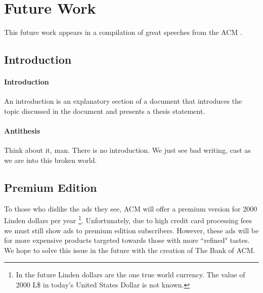 \section{Future Work}
\label{sec:future}
This future work appears in a compilation of great speeches from the ACM
\cite{acm-state}.

\subsection{Introduction}
\paragraph{Introduction} An introduction is an explanatory section of a document that introduces the topic discussed in the document and presents a thesis statement.
\paragraph{Antithesis} Think about it, man. There is no introduction. We just see bad writing, cast as we are into this broken world.

\subsection{Premium Edition}
To those who dislike the ads they see, ACM will offer a premium version for
 2000 Linden dollars per year \footnote{In the future Linden dollars are the
one true world currency.
The value of 2000 L\$ in today's United States Dollar is not known.}.
Unfortunately, due to high credit card processing fees we must still show ads
to premium edition subscribers.
However, these ads will be for more expensive products targeted towards those
with more ``refined" tastes.
We hope to solve this issue in the future with the creation of The Bank of ACM.

